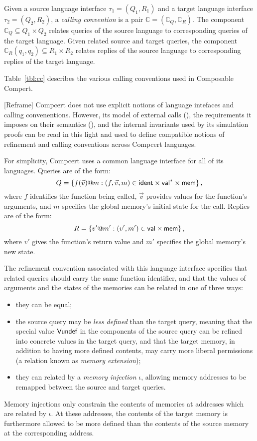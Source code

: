 \begin{definition}
Given a source language interface $\tau_1 = (Q_1, R_1)$ and
a target language interface $\tau_2 = (Q_2, R_2)$,
a \emph{calling convention} is a pair
$\mathbb{C} = (\mathbb{C}_Q, \mathbb{C}_R)$.
The component
$\mathbb{C}_Q \subseteq Q_1 \times Q_2$
relates queries of the source language to
corresponding queries of the target language.
Given related source and target queries,
the component
$\mathbb{C}_R(q_1, q_2) \subseteq R_1 \times R_2$
relates replies of the source language to
corresponding replies of the target language.
\end{definition}

Table~\ref{tbl:cc} describes the various calling conventions
used in Composable Compert.

[Reframe] Compcert does not use explicit notions of
language intefaces and calling convenentions.
However,
its model of external calls
(),
the requirements it imposes on their semantics
(),
and the internal invariants used by its simulation proofs
can be read in this light
and used to define
compatible notions of refinement and calling conventions
across Compcert languages.

For simplicity,
Compcert uses a common language interface
for all of its languages.
Queries are of the form:
\[
  Q = \{ f(\vec{v})@m : (f, \vec{v}, m) \in
     \textsf{ident}  \times  \textsf{val} ^* \times  \textsf{mem}  \} \,,
\]
where $f$ identifies the function being called,
$\vec{v}$ provides values for the function's arguments, and
$m$ specifies the global memory's initial state for the call.
Replies are of the form:
\[
  R = \{ v'@m' : (v', m') \in
     \textsf{val}  \times  \textsf{mem}  \} \,,
\]
where $v'$ gives the function's return value and
$m'$ specifies the global memory's new state.

The refinement convention associated with this language interface
specifies that
related queries should carry the same function identifier,
and that the values of arguments and the states of the memories
can be related in one of three ways:
\begin{itemize}
\item they can be equal;
\item the source query may be
  \emph{less defined} than the target query,
  meaning that the special value $ \textsf{Vundef} $
  in the components of the source query
  can be refined into concrete values in the target query,
  and that the target memory,
  in addition to having more defined contents,
  may carry more liberal permissions
  (a relation known as \emph{memory extension});
\item they can related by a \emph{memory injection} $\iota$,
  allowing memory addresses to be remapped
  between the source and target queries.
\end{itemize}
Memory injections only constrain the contents of memories
at addresses which are related by $\iota$.
At these addresses,
the contents of the target memory is furthermore
allowed to be more defined than the contents of the source
memory at the corresponding address.


